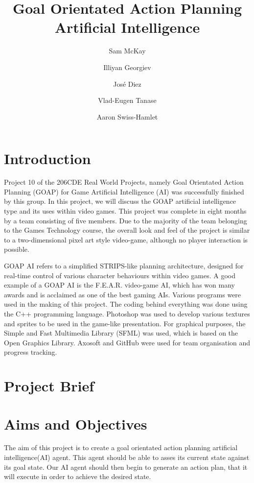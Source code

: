 \documentclass[a4paper]{report}
\begin{document}
\title{Goal Orientated Action Planning Artificial Intelligence}
\author{Sam McKay \and Illiyan Georgiev \and ‎José Diez\and Vlad-Eugen Tanase \and Aaron Swiss-Hamlet }
\maketitle
\tableofcontents
\chapter{Introduction}
Project 10 of the 206CDE Real World Projects, namely Goal Orientated Action Planning (GOAP) for Game Artificial Intelligence (AI) was successfully finished by this group. In this project, we will discuss the GOAP artificial intelligence type and its uses within video games. This project was complete in eight months by a team consisting of five members. Due to the majority of the team belonging to the Games Technology course, the overall look and feel of the project is similar to a two-dimensional pixel art style video-game, although no player interaction is possible. 
 
GOAP AI refers to a simplified STRIPS-like planning architecture, designed for real-time control of various character behaviours within video games. A good example of a GOAP AI is the F.E.A.R. video-game AI, which has won many awards and is acclaimed as one of the best gaming AIs. Various programs were used in the making of this project. The coding behind everything was done using the C++ programming language. Photoshop was used to develop various textures and sprites to be used in the game-like presentation. For graphical purposes, the Simple and Fast Multimedia Library (SFML) was used, which is based on the Open Graphics Library. Axosoft and GitHub were used for team organisation and progress tracking.

\chapter{Project Brief}
\chapter{Aims and Objectives}
The aim of this project is to create a goal orientated action planning artificial intelligence(AI) agent. This agent should be able to asses its current state against its goal state. Our AI agent should then begin to generate an action plan, that it will execute in order to achieve the desired state. \newline
\end{document}
